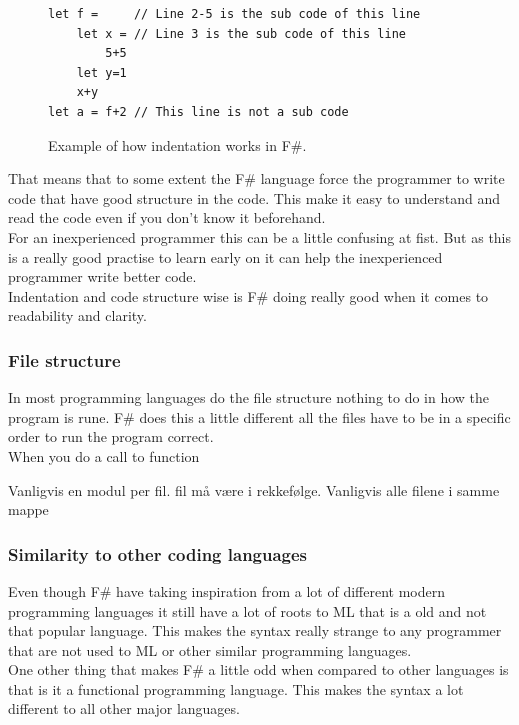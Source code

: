 \documentclass[12pt, a4paper]{article}
\begin{document}
\begin{figure}[!h]
	\begin{lstlisting}
let f = 	// Line 2-5 is the sub code of this line
	let x = // Line 3 is the sub code of this line
		5+5	
	let y=1
  	x+y
let a = f+2	// This line is not a sub code
	\end{lstlisting}
	\caption{Example of how indentation works in F\#.}
	\label{fig:indentationExample}
\end{figure}

That means that to some extent the F\# language force the programmer to write code that have good structure in the code. This make it easy to understand and read the code even if you don't know it beforehand.\\

For an inexperienced programmer this can be a little confusing at fist. But as this is a really good practise to learn early on it can help the inexperienced programmer write better code.\\

Indentation and code structure wise is F\# doing really good when it comes to readability and clarity.

\newpage
\subsubsection{File structure}

In most programming languages do the file structure nothing to do in how the program is rune. F\# does this a little different all the files have to be in a specific order to run the program correct.\\

When you do a call to function 

Vanligvis en modul per fil. fil må være i rekkefølge. Vanligvis alle filene i samme mappe

\newpage
\subsubsection{Similarity to other coding languages}

Even though F\# have taking inspiration from a lot of different modern programming languages it still have a lot of roots to ML that is a old and not that popular language. This makes the syntax really strange to any programmer that are not used to ML or other similar programming languages.\\

One other thing that makes F\# a little odd when compared to other languages is that is it a functional programming language. This makes the syntax a lot different to all other major languages.\\
\end{document}

